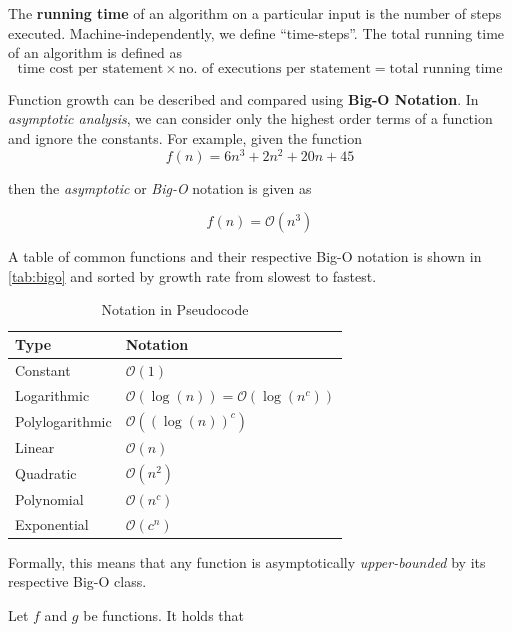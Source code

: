 The \textbf{running time} of an algorithm on a particular input is the number of steps executed. Machine-independently, we define ``time-steps''. The total running time of an algorithm is defined as
\[
    \textrm{time cost per statement} \times \textrm{no. of executions per statement} = \textrm{total running time}
\]

Function growth can be described and compared using \textbf{Big-O Notation}. In \emph{asymptotic analysis}, we can consider only the highest order terms of a function and ignore the constants. For example, given the function \[
    f(n) = 6n^3 + 2n^2 + 20n +45
\]

then the \emph{asymptotic} or \emph{Big-O} notation is given as

\[
    f(n) = \mathcal{O}(n^3)
\]

A table of common functions and their respective Big-O notation is shown in \autoref{tab:bigo} and sorted by growth rate from slowest to fastest.

\begin{table}[ht]
    \centering
    \begin{tabular}{ll}
        \toprule
        \textbf{Type}   & \textbf{Notation}                                \\ \midrule
        Constant        & \( \mathcal{O}(1) \)                             \\
        Logarithmic     & \(\mathcal{O}(\log(n)) =\mathcal{O}(\log(n^c))\) \\
        Polylogarithmic & \(\mathcal{O}((\log(n))^c) \)                    \\
        Linear          & \(\mathcal{O}(n) \)                              \\
        Quadratic       & \(\mathcal{O}(n^2) \)                            \\
        Polynomial      & \(\mathcal{O}(n^c) \)                            \\
        Exponential     & \(\mathcal{O}(c^n) \)                            \\
        \bottomrule
    \end{tabular}
    \caption{Notation in Pseudocode}\label{tab:bigo2}
\end{table}

Formally, this means that any function is asymptotically \emph{upper-bounded} by its respective Big-O class.

Let \( f \) and \( g \) be functions. It holds that

